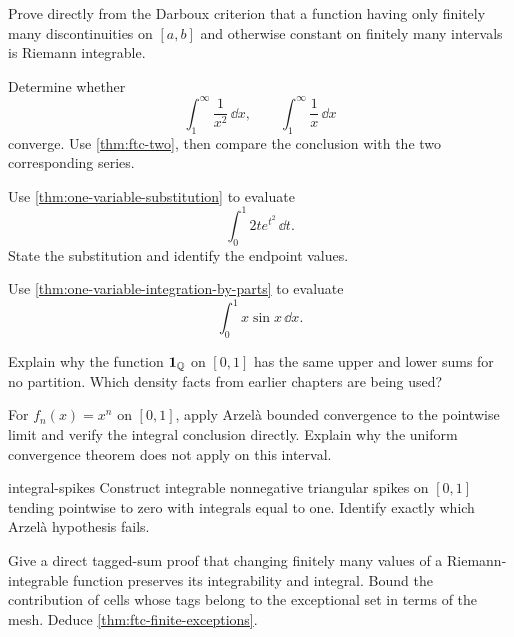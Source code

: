 \begin{exercise}
Prove directly from the Darboux criterion that a function having only finitely many discontinuities on $[a,b]$ and otherwise constant on finitely many intervals is Riemann integrable.
\end{exercise}

\begin{exercise}
Determine whether
\[
\int_1^\infty\frac{1}{x^2}\,\dd x,\qquad \int_1^\infty\frac{1}{x}\,\dd x
\]
converge. Use \cref{thm:ftc-two}, then compare the conclusion with the two corresponding series.
\end{exercise}

\begin{exercise}
Use \cref{thm:one-variable-substitution} to evaluate
\[
\int_0^1 2te^{t^2}\,\dd t.
\]
State the substitution and identify the endpoint values.
\end{exercise}

\begin{exercise}
Use \cref{thm:one-variable-integration-by-parts} to evaluate
\[
\int_0^1 x\sin x\,\dd x.
\]
\end{exercise}

\begin{exercise}
Explain why the function $\mathbf{1}_{\mathbb{Q}}$ on $[0,1]$ has the same upper and lower sums for no partition. Which density facts from earlier chapters are being used?
\end{exercise}

\begin{exercise}
For $f_n(x)=x^n$ on $[0,1]$, apply Arzel\`a bounded convergence to
the pointwise limit and verify the integral conclusion directly. Explain
why the uniform convergence theorem does not apply on this interval.
\end{exercise}
\begin{hexercise}{integral-spikes}
Construct integrable nonnegative triangular spikes on $[0,1]$ tending
pointwise to zero with integrals equal to one. Identify exactly which
Arzel\`a hypothesis fails.
\end{hexercise}

\begin{exercise}
Give a direct tagged-sum proof that changing finitely many values of a
Riemann-integrable function preserves its integrability and integral.
Bound the contribution of cells whose tags belong to the exceptional set
in terms of the mesh. Deduce \cref{thm:ftc-finite-exceptions}.
\end{exercise}

